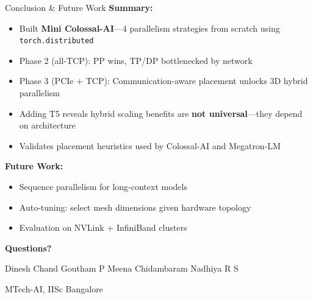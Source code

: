 \documentclass[10pt, aspectratio=169]{beamer}
\begin{document}
\begin{frame}{Conclusion \& Future Work}
  \textbf{Summary:}
  \begin{itemize}
    \item Built \textbf{Mini Colossal-AI}---4 parallelism strategies from scratch using \texttt{torch.distributed}
    \item Phase 2 (all-TCP): PP wins, TP/DP bottlenecked by network
    \item Phase 3 (PCIe + TCP): Communication-aware placement unlocks 3D hybrid parallelism
    \item Adding T5 reveals hybrid scaling benefits are \textbf{not universal}---they depend on architecture
    \item Validates placement heuristics used by Colossal-AI and Megatron-LM
  \end{itemize}

  \vspace{0.5em}
  \textbf{Future Work:}
  \begin{itemize}
    \item Sequence parallelism for long-context models
    \item Auto-tuning: select mesh dimensions given hardware topology
    \item Evaluation on NVLink + InfiniBand clusters
  \end{itemize}
\end{frame}

\begin{frame}
  \centering
  \vspace{2cm}
  {\Huge\bfseries Questions?}
  \vspace{1cm}

  {\large Dinesh Chand \quad Goutham P \quad Meena Chidambaram \quad Nadhiya R S}

  \vspace{0.3em}
  {\small MTech-AI, IISc Bangalore}
\end{frame}
\end{document}
